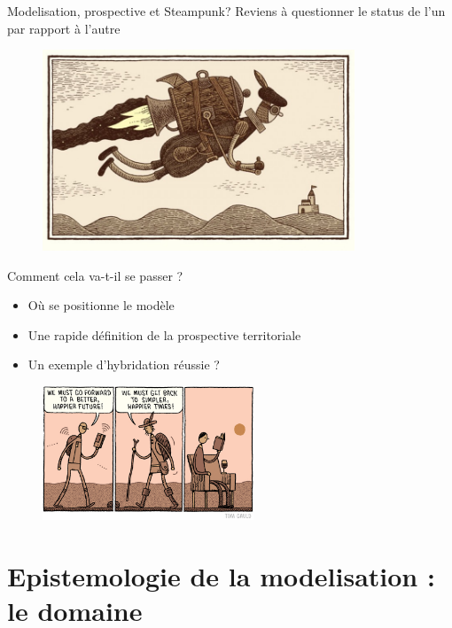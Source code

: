 \documentclass[newPxFont]{beamer}
\begin{document}
\begin{frame}[c]{Modelisation, prospective et Steampunk?}
  \vspace{-1cm}
  Reviens à questionner le status de l'un par rapport à l'autre
  \begin{figure}
    \includegraphics[height=6cm]{img/a_Tom-Gauld-jetpack.jpg}
  \end{figure}
\end{frame}

\begin{frame}[c]{Comment cela va-t-il se passer ?}
  \vspace{-1cm}
  \begin{itemize}
    \item Où se positionne le modèle
    \item Une rapide définition de la prospective territoriale
    \item Un exemple d'hybridation réussie ?
  \end{itemize}

  \begin{figure}
    \includegraphics[height=4cm]{./img/a_Tom-Gauld-walk.jpg}
  \end{figure}
\end{frame}

\section{Epistemologie de la modelisation : le domaine}

\end{document}
